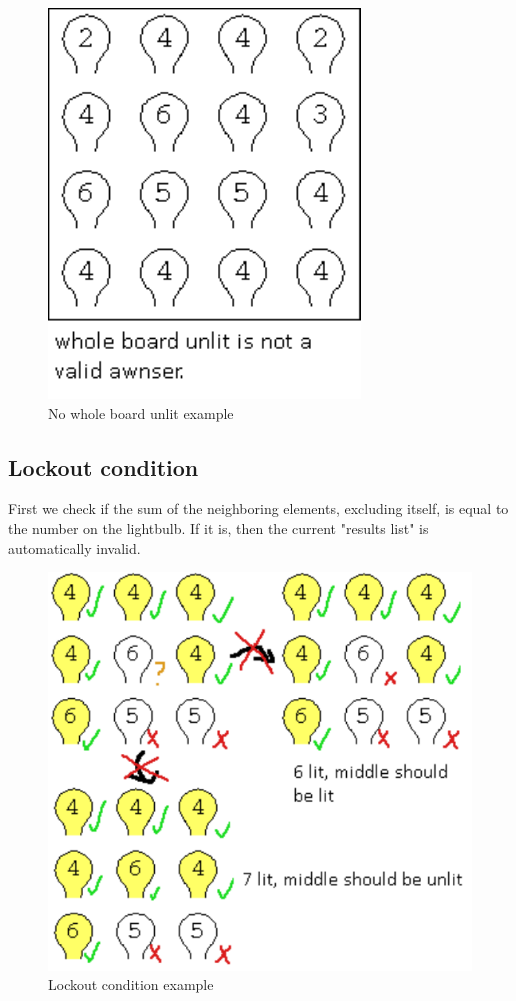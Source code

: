 \documentclass[runningheads]{llncs}
\begin{document}
\begin{figure}
	\includegraphics[scale=0.5]{lightbulb_no_whole_board_unlit_restriction}
	\centering
	\caption{No whole board unlit example}
	\centering
	\end{figure}

\subsection*{Lockout condition}
First we check if the sum of the neighboring elements, excluding itself, is equal to the number on the lightbulb. If it is, then the current "results list" is automatically invalid.
\begin{figure}
	\includegraphics[scale=0.5]{lightbulb_impossible_state}
	\centering
	\caption{Lockout condition example}
	\centering
	\end{figure}
\end{document}

